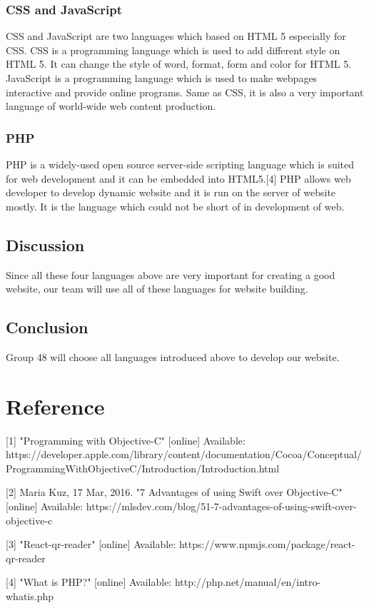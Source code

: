 \documentclass[letterpaper, 10pt,titlepage]{article}
\begin{document}
\subsubsection{CSS and JavaScript}
CSS and JavaScript are two languages which based on HTML 5 especially for CSS. CSS is a programming language which is used to add different style on HTML 5. It can change the style of word, format, form and color for HTML 5. JavaScript is a programming language which is used to make webpages interactive and provide online programs. Same as CSS, it is also a very important language of world-wide web content production. 

\subsubsection{PHP}
PHP is a widely-used open source server-side scripting language which is suited for web development and it can be embedded into HTML5.[4] PHP allows web developer to develop dynamic website and it is run on the server of website mostly. It is the language which could not be short of in development of web.

\subsection{Discussion}
Since all these four languages above are very important for creating a good website, our team will use all of these languages for website building.

\subsection{Conclusion}
Group 48 will choose all languages introduced above to develop our website.


\section{Reference}
[1] "Programming with Objective-C" [online] 
Available: https://developer.apple.com/library/content/documentation/Cocoa/Conceptual/ProgrammingWithObjectiveC/Introduction/Introduction.html

[2] Maria Kuz, 17 Mar, 2016. "7 Advantages of using Swift over Objective-C" [online] Available: https://mlsdev.com/blog/51-7-advantages-of-using-swift-over-objective-c

[3] "React-qr-reader" [online] 
Available: https://www.npmjs.com/package/react-qr-reader

[4] "What is PHP?" [online]
Available: http://php.net/manual/en/intro-whatis.php
\end{document}
